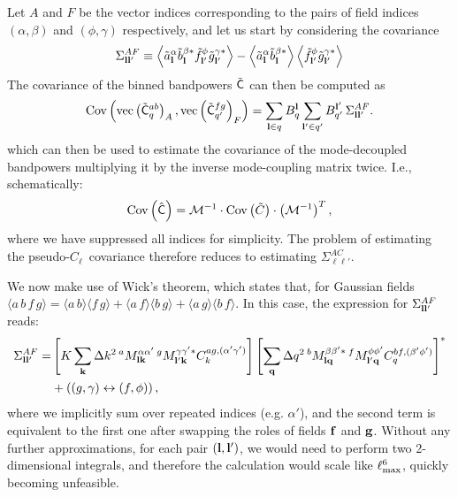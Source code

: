 \documentclass[a4paper,11pt]{article}
\newcommand{\PCL}{pseudo-$C_\ell$~}
\newcommand{\summ}[1]{\sum_{\bf #1}\Delta #1^2}
\begin{document}
    Let $A$ and $F$ be the vector indices corresponding to the pairs of field indices $(\alpha,\beta)$ and $(\phi,\gamma)$ respectively, and let us start by considering the covariance
    \begin{equation}
      \Sigma^{AF}_{{\bf l}{\bf l}'}\equiv\left\langle\tilde{a}^\alpha_{\bf l}\tilde{b}^{\beta *}_{\bf l}\tilde{f}^\phi_{{\bf l}'}\tilde{g}^{\gamma *}_{{\bf l}'}\right\rangle-\left\langle\tilde{a}^\alpha_{\bf l}\tilde{b}^{\beta *}_{\bf l}\right\rangle\left\langle\tilde{f}^\phi_{{\bf l}'}\tilde{g}^{\gamma *}_{{\bf l}'}\right\rangle
    \end{equation}
    The covariance of the binned bandpowers $\tilde{\sf C}$ can then be computed as
    \begin{equation}\label{eq:cov_binned}
      {\rm Cov}\left({\rm vec}\left(\tilde{\sf C}^{ab}_q\right)_A,{\rm vec}\left(\tilde{\sf C}^{fg}_{q'}\right)_F\right)=\sum_{{\bf l}\in q} B^{\bf l}_q\sum_{{\bf l}'\in q'} B^{{\bf l}'}_{q'}\,\Sigma^{AF}_{{\bf l}{\bf l}'}.
    \end{equation}
    which can then be used to estimate the covariance of the mode-decoupled bandpowers multiplying it by the inverse mode-coupling matrix twice. I.e., schematically:
    \begin{equation}
      {\rm Cov}\left(\hat{\sf C}\right)=\mathcal{M}^{-1}\cdot{\rm Cov}\left(\tilde{C}\right)\cdot\left(\mathcal{M}^{-1}\right)^{T},
    \end{equation}
    where we have suppressed all indices for simplicity. The problem of estimating the \PCL covariance therefore reduces to estimating $\Sigma^{AC}_{\ell\ell'}$.
    
    We now make use of Wick's theorem, which states that, for Gaussian fields $\langle a\,b\,f\,g\rangle=\langle a\,b\rangle\langle f\,g\rangle+\langle a\,f\rangle\langle b\,g\rangle+\langle a\,g\rangle\langle b\,f\rangle$. In this case, the expression for $\Sigma^{AF}_{{\bf l}{\bf l'}}$ reads:
    \begin{align}\nonumber
      \Sigma^{AF}_{{\bf l}{\bf l}'}=&\left[K\summ{k}\,^aM^{\alpha\alpha'}_{{\bf l}{\bf k}}\,^gM^{\gamma\gamma'*}_{{\bf l}'{\bf k}}C^{ag,(\alpha'\gamma')}_k\right]\left[\summ{q}\,^bM^{\beta\beta'*}_{{\bf l}{\bf q}}\,^fM^{\phi\phi'}_{{\bf l}'{\bf q}}C^{bf,(\beta'\phi')}_q\right]^*\\\label{eq:covar_general}
      &+\left((g,\gamma)\leftrightarrow(f,\phi)\right),
    \end{align}
    where we implicitly sum over repeated indices (e.g. $\alpha'$), and the second term is equivalent to the first one after swapping the roles of fields ${\bf f}$ and ${\bf g}$. Without any further approximations, for each pair $({\bf l},{\bf l}')$, we would need to perform two 2-dimensional integrals, and therefore the calculation would scale like $\ell_{\rm max}^6$, quickly becoming unfeasible.
    
\end{document}

